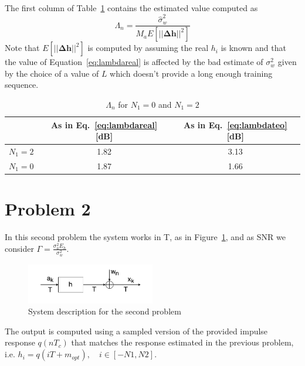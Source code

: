 \documentclass[10pt]{article}
\begin{document}
The first column of Table~\ref{table:lambda} contains the estimated value computed as
\begin{equation}
	\Lambda_n = \frac{\hat{\sigma}_w^2}{M_a E[||\mathbf{\Delta h}||^2]}
	\label{eq:lambdareal}
\end{equation}
Note that $E[||\mathbf{\Delta h}||^2]$ is computed by assuming the real $h_i$ is known and that the value of Equation~\eqref{eq:lambdareal} is affected by the bad estimate of $\sigma_w^2$ given by the choice of a value of $L$ which doesn't provide a long enough training sequence.

\begin{table}[h!]
	\centering
	\begin{tabular}{c|c|c}
				&	As in Eq.~\eqref{eq:lambdareal} [dB]	& As in Eq.~\eqref{eq:lambdateo} [dB]  \\ \hline
	$N_1 = 2$	&	1.82							& 3.13 \\
	$N_1 = 0$	&	1.87							& 1.66 \\
	\end{tabular}
	\caption{$\Lambda_n$ for $N_1 = 0$ and $N_1 = 2$}
	\label{table:lambda}
\end{table}

\clearpage


\section*{Problem 2}

In this second problem the system works in T, as in Figure~\ref{fig:channelt}, and as SNR we consider $\Gamma = \frac{\sigma_a^2 E_h}{\sigma_w^2}$. 

\begin{figure}[h!]
	\centering
	\includegraphics[width=0.5\textwidth]{channel_t}
	\caption{System description for the second problem}
	\label{fig:channelt}
\end{figure}

The output is computed using a sampled version of the provided impulse response $q(nT_c)$ that matches the response estimated in the previous problem, i.e. $h_i = q(iT + m_{opt}), \quad i \in [-N1, N2]$. 
\end{document}
